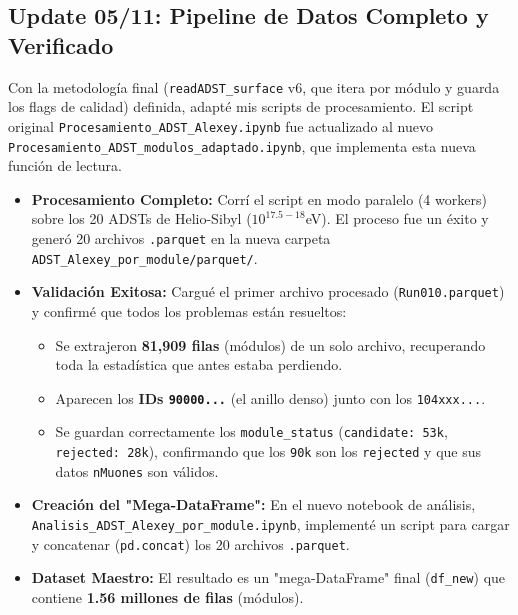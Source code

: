 \subsection*{Update 05/11: Pipeline de Datos Completo y Verificado}

Con la metodología final (\lstinline|readADST_surface| v6, que itera por módulo y guarda los flags de calidad) definida, adapté mis scripts de procesamiento. El script original \lstinline|Procesamiento_ADST_Alexey.ipynb| fue actualizado al nuevo \lstinline|Procesamiento_ADST_modulos_adaptado.ipynb|, que implementa esta nueva función de lectura.

\begin{itemize}
	\item \textbf{Procesamiento Completo:} Corrí el script en modo paralelo (4 workers) sobre los 20 ADSTs de Helio-Sibyl ($10^{17.5-18}$eV). El proceso fue un éxito y generó 20 archivos \lstinline|.parquet| en la nueva carpeta \lstinline|ADST_Alexey_por_module/parquet/|.
	
	\item \textbf{Validación Exitosa:} Cargué el primer archivo procesado (\lstinline|Run010.parquet|) y confirmé que todos los problemas están resueltos:
	\begin{itemize}
		\item Se extrajeron \textbf{81,909 filas} (módulos) de un solo archivo, recuperando toda la estadística que antes estaba perdiendo.
		\item Aparecen los \textbf{IDs \lstinline|90000...|} (el anillo denso) junto con los \lstinline|104xxx...|.
		\item Se guardan correctamente los \lstinline|module_status| (\lstinline|candidate: 53k|, \lstinline|rejected: 28k|), confirmando que los \lstinline|90k| son los \lstinline|rejected| y que sus datos \lstinline|nMuones| son válidos.
	\end{itemize}
	
	\item \textbf{Creación del "Mega-DataFrame":} En el nuevo notebook de análisis, \lstinline|Analisis_ADST_Alexey_por_module.ipynb|, implementé un script para cargar y concatenar (\lstinline|pd.concat|) los 20 archivos \lstinline|.parquet|.
	
	\item \textbf{Dataset Maestro:} El resultado es un "mega-DataFrame" final (\lstinline|df_new|) que contiene \textbf{1.56 millones de filas} (módulos).
\end{itemize}

